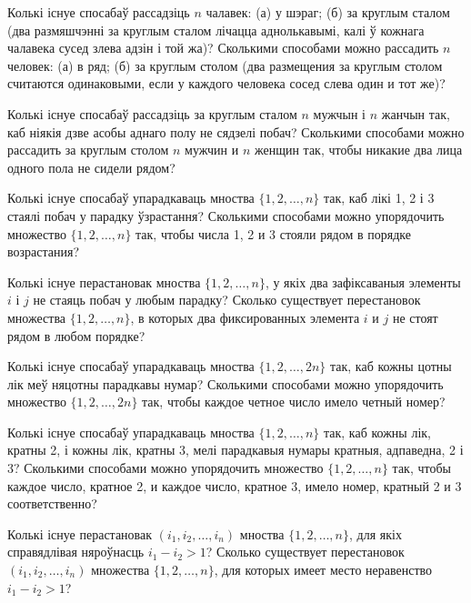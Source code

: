 \begin{problemList}
\bigskip

\problemItemSimple
{Колькі існуе спосабаў рассадзіць $n$ чалавек: (а) у шэраг;
(б) за круглым сталом (два размяшчэнні за круглым сталом лічацца аднолькавымі,
калі ў кожнага чалавека сусед злева адзін і той жа)?}
{Сколькими способами можно рассадить $n$ человек: (а) в ряд; (б) за
круглым столом (два размещения за круглым столом считаются
одинаковыми, если у каждого человека сосед слева один и тот же)?}

\bigskip

\problemItemSimple
{Колькі існуе спосабаў рассадзіць за круглым сталом $n$ мужчын і $n$ жанчын так,
каб ніякія дзве асобы аднаго полу не сядзелі побач?}
{Сколькими способами можно рассадить за круглым столом $n$ мужчин и
$n$ женщин так, чтобы никакие два лица одного пола не сидели рядом?}

\bigskip

\problemItemSimple
{Колькі існуе спосабаў упарадкаваць мноства $\{1, 2, \ldots, n\}$ так,
каб лікі 1, 2 і 3 стаялі побач у парадку ўзрастання?}
{Сколькими способами можно упорядочить множество $\{1, 2, \ldots, n\}$
так, чтобы числа 1, 2 и 3 стояли рядом в порядке возрастания?}

\bigskip

\problemItemSimple
{Колькі існуе перастановак мноства $\{1, 2, \ldots, n\}$, у якіх два зафіксаваныя
элементы $i$ і $j$ не стаяць побач у любым парадку?}
{Сколько существует перестановок множества $\{1, 2, \ldots, n\}$, в
которых два фиксированных элемента $i$ и $j$ не стоят рядом в любом
порядке?}

\bigskip

\problemItemSimple
{Колькі існуе спосабаў упарадкаваць мноства $\{1, 2, \ldots, 2n\}$ так,
каб кожны цотны лік меў няцотны парадкавы нумар?}
{Сколькими способами можно упорядочить множество $\{1, 2, \ldots, 2n\}$
так, чтобы каждое четное число имело четный номер?}

\bigskip

\problemItemSimple
{Колькі існуе спосабаў упарадкаваць мноства $\{1, 2, \ldots, n\}$ так,
каб кожны лік, кратны 2, і кожны лік, кратны 3, мелі парадкавыя нумары кратныя,
адпаведна, 2 і 3?}
{Сколькими способами можно упорядочить множество $\{1, 2, \ldots, n\}$
так, чтобы каждое число, кратное 2, и каждое число, кратное 3, имело
номер, кратный 2 и 3 соответственно?}

\bigskip

\problemItemSimple
{Колькі існуе перастановак $(i_1, i_2, \ldots, i_n)$ мноства $\{1, 2, \ldots, n\}$,
для якіх справядлівая няроўнасць $i_1 - i_2 > 1$?}
{Сколько существует перестановок $(i_1, i_2, \ldots, i_n)$ множества
$\{1, 2, \ldots, n\}$, для которых имеет место неравенство
$i_1 - i_2 > 1$?}

\end{problemList}

